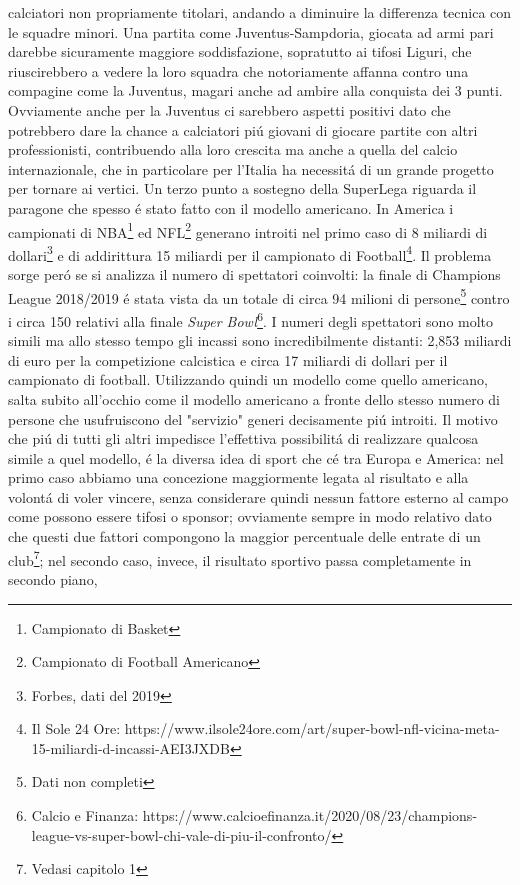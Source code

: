 \documentclass[
    corpo=12pt,
    oneside,
    evenboxes,
    tipotesi=triennale,
    stile=classica,
    oldstyle,
    autoretitolo,
    greek,
]{toptesi}
\begin{document}
\begin{interlinea}{1.5}
calciatori non propriamente titolari, andando a diminuire la differenza tecnica con le squadre minori. Una partita come Juventus-Sampdoria, giocata
ad armi pari darebbe sicuramente maggiore soddisfazione, sopratutto ai tifosi Liguri, che riuscirebbero a vedere la loro squadra che notoriamente
affanna contro una compagine come la Juventus, magari anche ad ambire alla conquista dei 3 punti. Ovviamente anche per la Juventus ci sarebbero
aspetti positivi dato che potrebbero dare la chance a calciatori pi\'u giovani di giocare partite con altri professionisti, contribuendo alla loro 
crescita ma anche a quella del calcio internazionale, che in particolare per l'Italia ha necessit\'a di un grande progetto per tornare ai vertici.
Un terzo punto a sostegno della SuperLega riguarda il paragone che spesso \'e stato fatto con il modello americano. In America i campionati di NBA\footnote{Campionato di Basket}
ed NFL\footnote{Campionato di Football Americano} generano introiti nel primo caso di 8 miliardi di dollari\footnote{Forbes, dati del 2019} e di addirittura
15 miliardi per il campionato di Football\footnote{Il Sole 24 Ore: https://www.ilsole24ore.com/art/super-bowl-nfl-vicina-meta-15-miliardi-d-incassi-AEI3JXDB}.
Il problema sorge per\'o se si analizza il numero di spettatori coinvolti: la finale di Champions League 2018/2019 \'e stata vista da un totale di 
circa 94 milioni di persone\footnote{Dati non completi} contro i circa 150 relativi alla finale \emph{Super Bowl}\footnote{Calcio e Finanza: https://www.calcioefinanza.it/2020/08/23/champions-league-vs-super-bowl-chi-vale-di-piu-il-confronto/}. 
I numeri degli spettatori sono molto simili ma allo stesso tempo gli incassi sono incredibilmente distanti: 2,853 miliardi di euro per la competizione calcistica e 
circa 17 miliardi di dollari per il campionato di football. Utilizzando quindi un modello come quello americano, salta subito all'occhio come 
il modello americano a fronte dello stesso numero di persone che usufruiscono del "servizio" generi decisamente pi\'u introiti. Il motivo che pi\'u 
di tutti gli altri impedisce l'effettiva possibilit\'a di realizzare qualcosa simile a quel modello, \'e la diversa idea di sport che c\'e tra
Europa e America: nel primo caso abbiamo una concezione maggiormente legata al risultato e alla volont\'a di voler vincere, senza considerare quindi
nessun fattore esterno al campo come possono essere tifosi o sponsor; ovviamente sempre in modo relativo dato che questi due fattori compongono la 
maggior percentuale delle entrate di un club\footnote{Vedasi capitolo 1}; nel secondo caso, invece, il risultato sportivo passa completamente in secondo piano,

\end{interlinea}
\end{document}
